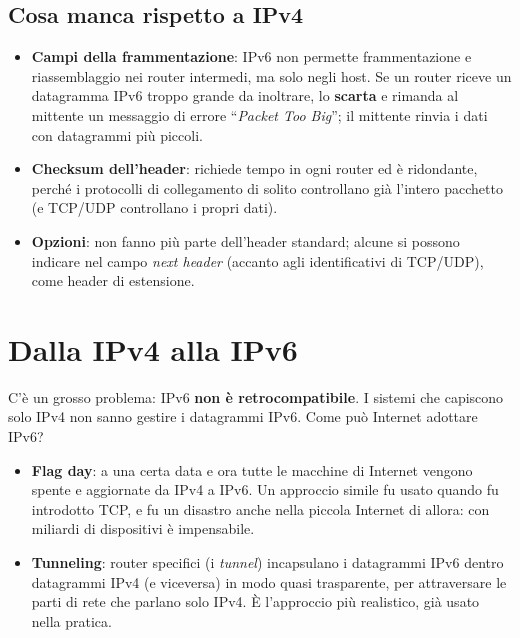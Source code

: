 \subsection{Cosa manca rispetto a IPv4}

\begin{itemize}
    \item \textbf{Campi della frammentazione}: IPv6 non permette frammentazione e riassemblaggio nei router intermedi, ma solo negli
          host. Se un router riceve un datagramma IPv6 troppo grande da inoltrare, lo \textbf{scarta} e rimanda al mittente un
          messaggio di errore ``\emph{Packet Too Big}''; il mittente rinvia i dati con datagrammi più piccoli.
    \item \textbf{Checksum dell'header}: richiede tempo in ogni router ed è ridondante, perché i protocolli di collegamento di
          solito controllano già l'intero pacchetto (e TCP/UDP controllano i propri dati).
    \item \textbf{Opzioni}: non fanno più parte dell'header standard; alcune si possono indicare nel campo \emph{next header}
          (accanto agli identificativi di TCP/UDP), come header di estensione.
\end{itemize}

\section{Dalla IPv4 alla IPv6}

C'è un grosso problema: IPv6 \textbf{non è retrocompatibile}. I sistemi che capiscono solo IPv4 non sanno gestire i datagrammi IPv6.
Come può Internet adottare IPv6?

\begin{itemize}
    \item \textbf{Flag day}: a una certa data e ora tutte le macchine di Internet vengono spente e aggiornate da IPv4 a IPv6. Un
          approccio simile fu usato quando fu introdotto TCP, e fu un disastro anche nella piccola Internet di allora: con miliardi
          di dispositivi è impensabile.
    \item \textbf{Tunneling}: router specifici (i \emph{tunnel}) incapsulano i datagrammi IPv6 dentro datagrammi IPv4 (e viceversa)
          in modo quasi trasparente, per attraversare le parti di rete che parlano solo IPv4. È l'approccio più realistico, già
          usato nella pratica.
\end{itemize}

